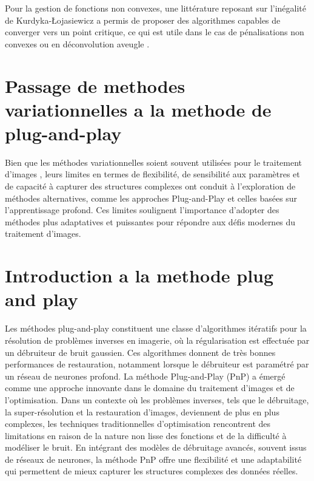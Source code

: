 \documentclass[a4paper, 12pt]{article} %
\begin{document}
Pour la gestion de fonctions non convexes, une littérature reposant sur l'inégalité de Kurdyka-Łojasiewicz a permis de proposer des algorithmes capables de converger vers un point critique, ce qui est utile dans le cas de pénalisations non convexes ou en déconvolution aveugle \cite{9}.







\section{\large Passage de methodes variationnelles a la methode de plug-and-play } 

Bien que les méthodes variationnelles soient souvent utilisées pour le traitement d'images , leurs limites en termes de flexibilité, de sensibilité aux paramètres et de capacité à capturer des structures complexes ont conduit à l'exploration de méthodes alternatives, comme les approches Plug-and-Play et celles basées sur l'apprentissage profond. Ces limites soulignent l'importance d'adopter des méthodes plus adaptatives et puissantes pour répondre aux défis modernes du traitement d'images.

\section{\large Introduction a la methode plug and play }

Les méthodes plug-and-play constituent une classe d’algorithmes itératifs pour la résolution de problèmes inverses en imagerie, où la régularisation est effectuée par un débruiteur de bruit gaussien. Ces algorithmes donnent de très bonnes performances de restauration, notamment lorsque le débruiteur est paramétré par un réseau de neurones profond. La méthode Plug-and-Play (PnP) a émergé comme une approche innovante dans le domaine du traitement d'images et de l'optimisation. Dans un contexte où les problèmes inverses, tels que le débruitage, la super-résolution et la restauration d'images, deviennent de plus en plus complexes, les techniques traditionnelles d'optimisation rencontrent des limitations en raison de la nature non lisse des fonctions et de la difficulté à modéliser le bruit. En intégrant des modèles de débruitage avancés, souvent issus de réseaux de neurones, la méthode PnP offre une flexibilité et une adaptabilité qui permettent de mieux capturer les structures complexes des données réelles. 
\end{document}
